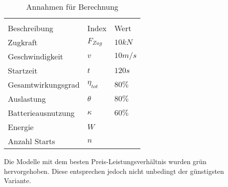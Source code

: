 \begin{table}[H]
	\centering
	\begin{tabular}{C{5cm} C{2.5cm} C{2cm}}
		\\
	{Beschreibung} & {Index} & {Wert} \\ \hline
	Zugkraft    &   $ F_{Zug} $    & $10 kN$   \\
	Geschwindigkeit    &   $ v $    & $10 m/s$   \\
	Startzeit    &   $ t $   & $120 s$   \\
	Gesamtwirkungsgrad    &  $ \eta_{tot} $    & $80\%$   \\
	Auslastung    &  $ \theta $   & $80\%$  \\
	Batterieausnutzung    &  $ \kappa $    & $60\%$   \\
	Energie    &   $ W $    &   \\
	Anzahl Starts    &   $ n $    &    \\	
\end{tabular}
\caption{Annahmen für Berechnung}
\label{tab:BerechnungAnzahlStart}
\end{table}


Die Modelle mit dem besten Preis-Leistungsverhältnis wurden grün hervorgehoben. Diese entsprechen jedoch nicht unbedingt der günstigsten Variante.
